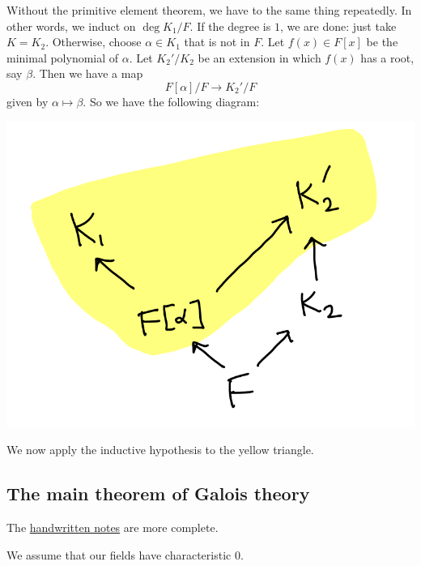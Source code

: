 \documentclass[11pt]{article}
\begin{document}
\begin{enumerate}
Without the primitive element theorem, we have to the same thing repeatedly.
In other words, we induct on \(\deg K_1/F\).
If the degree is \(1\), we are done: just take \(K = K_2\).
Otherwise, choose \(\alpha \in K_{1}\) that is not in \(F\).
Let \(f(x) \in F[x]\) be the minimal polynomial of \(\alpha\).
Let \(K_2'/K_2\) be an extension in which \(f(x)\) has a root, say \(\beta\).
Then we have a map
\[ F[\alpha]/F \to K_{2}'/F\]
given by \(\alpha \mapsto \beta\).
So we have the following diagram:

\begin{center}
\includegraphics[width=.9\linewidth]{assets/Course_notes/2023-04-24_11-54-21_screenshot.png}
\end{center}
We now apply the inductive hypothesis to the yellow triangle.
\end{enumerate}
\subsection{The main theorem of Galois theory}
\label{sec:org025db25}
The \href{assets/Course\_notes/2023-05-02-Note-14-56.pdf}{handwritten notes} are more complete.

We assume that our fields have characteristic 0.
\end{document}
